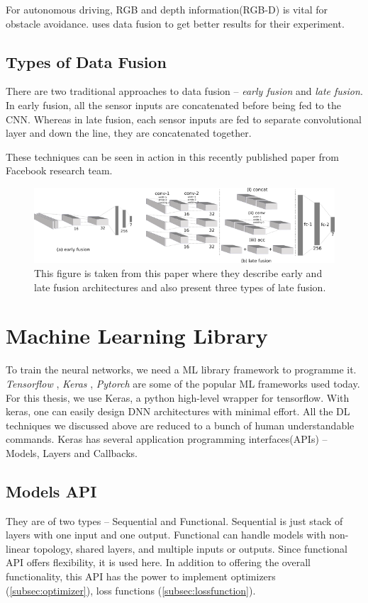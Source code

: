 For autonomous driving, RGB and depth information(RGB-D) is vital for obstacle avoidance.
\cite{XiaoCodevillaMultimodalE2E} uses data fusion to get better results for their
experiment.
\subsection{Types of Data Fusion}
There are two traditional approaches to data fusion -- \textit{early fusion} and
\textit{late fusion}.
In early fusion, all the sensor inputs are concatenated before being fed to the CNN.
Whereas in late fusion, each sensor inputs are fed to separate convolutional layer and
down the line, they are concatenated together.

These techniques can be seen in action in this \cite{wang2020makes} recently
published paper from Facebook research team.
\begin{figure}[h]
	\begin{center}
        \includegraphics[width=\textwidth]{figures/inkscape/datafusion.png} %
	\end{center}
    \caption{This figure is taken from this \cite{Datafusion4} paper where they describe early and
        late fusion architectures and also present three types of late fusion.}
    \label{fig:Datafusiontypes}
\end{figure}


\section{Machine Learning Library}
To train the neural networks, we need a ML library framework to programme it. \textit{Tensorflow}
\cite{tensorflow},
\textit{Keras} \cite{Keras}, \textit{Pytorch} \cite{pyTorch} are some of the popular ML
frameworks used today.
For this thesis, we use Keras, a python high-level wrapper for tensorflow. With keras, one
can easily design DNN architectures with minimal effort. All the DL techniques we
discussed above are reduced to a bunch of human understandable commands.
Keras has several application programming interfaces(APIs) -- Models, Layers and
Callbacks.
\subsection{Models API}
They are of two types -- Sequential and Functional. Sequential is just stack of layers
with one input and one output. Functional can handle models with non-linear topology,
shared layers, and multiple inputs or outputs. Since functional API offers flexibility, it
is used here.
In addition to offering the overall functionality, this API has the power to implement
optimizers (\ref{subsec:optimizer}), loss functions (\ref{subsec:lossfunction}).

